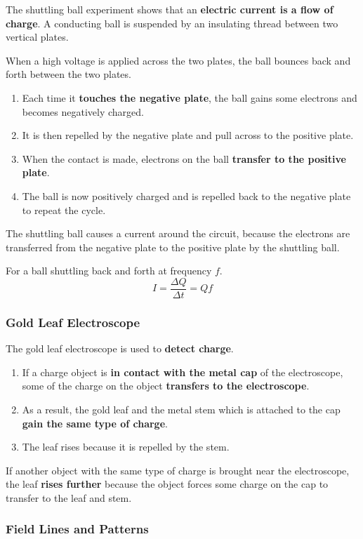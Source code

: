 The shuttling ball experiment shows that an \textbf{electric current is a flow of charge}. A conducting ball is suspended by an insulating thread between two vertical plates.

When a high voltage is applied across the two plates, the ball bounces back and forth between the two plates.
\begin{enumerate}
    \item Each time it \textbf{touches the negative plate}, the ball  gains some electrons and becomes negatively charged.
    \item It is then repelled by the negative plate and pull across to the positive plate.
    \item When the contact is made, electrons on the ball \textbf{transfer to the positive plate}.
    \item The ball is now positively charged and is repelled back to the negative plate to repeat the cycle.
\end{enumerate}

The shuttling ball causes a current around the circuit, because the electrons are transferred from the negative plate to the positive plate by the shuttling ball.

For a ball shuttling back and forth at frequency $f$.
$$I=\frac{\Delta Q}{\Delta t}=Qf$$

\subsubsection*{Gold Leaf Electroscope}

The gold leaf electroscope is used to \textbf{detect charge}.
\begin{enumerate}
    \item If a charge object is \textbf{in contact with the metal cap} of the electroscope, some of the charge on the object \textbf{transfers to the electroscope}.
    \item As a result, the gold leaf and the metal stem which is attached to the cap \textbf{gain the same type of charge}.
    \item The leaf rises because it is repelled by the stem.
\end{enumerate}

If another object with the same type of charge is brought near the electroscope, the leaf \textbf{rises further} because the object forces some charge on the cap to transfer to the leaf and stem.

\subsubsection*{Field Lines and Patterns}

